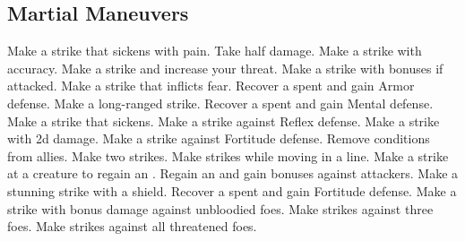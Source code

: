 \subsection{Martial Maneuvers}\label{Martial Maneuvers}
\begin{spelllist}
 Make a strike that sickens with pain.
 Take half damage.
 Make a strike with  accuracy.
 Make a strike and increase your threat.
 Make a strike with bonuses if attacked.
 Make a strike that inflicts fear.
 Recover a spent  and gain  Armor defense.
 Make a long-ranged strike.
 Recover a spent  and gain  Mental defense.
 Make a strike that sickens.
 Make a strike against Reflex defense.
 Make a strike with \plus2d damage.
 Make a strike against Fortitude defense.
 Remove conditions from allies.
 Make two strikes.
 Make strikes while moving in a line.
 Make a strike at a creature to regain an .
 Regain an  and gain bonuses against attackers.
 Make a stunning strike with a shield.
 Recover a spent  and gain  Fortitude defense.
 Make a strike with bonus damage against unbloodied foes.
 Make strikes against three foes.
 Make strikes against all threatened foes.
\end{spelllist}



\small
